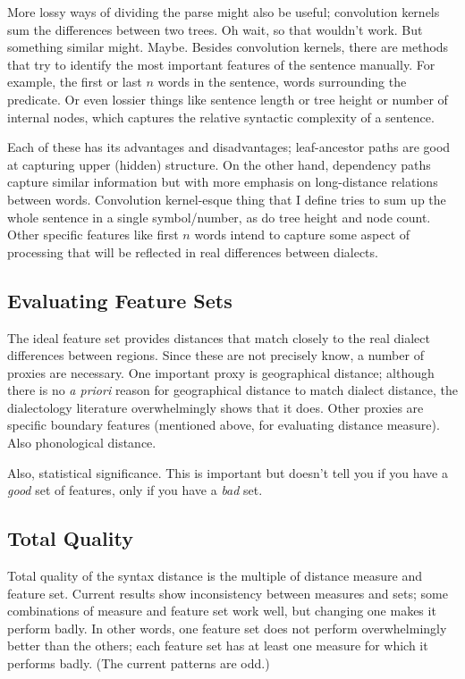 More lossy ways of dividing the parse might also be useful;
convolution kernels sum the differences between two trees. Oh wait, so
that wouldn't work. But something similar might. Maybe. Besides
convolution kernels, there are methods that try to identify the most
important features of the sentence manually. For example, the first or
last $n$ words in the sentence, words surrounding the predicate. Or
even lossier things like sentence length or tree height or number of
internal nodes, which captures the relative syntactic complexity of a
sentence.

Each of these has its advantages and disadvantages; leaf-ancestor
paths are good at capturing upper (hidden) structure. On the other
hand, dependency paths capture similar information but with more
emphasis on long-distance relations between words. Convolution
kernel-esque thing that I define tries to sum up the whole sentence in
a single symbol/number, as do tree height and node count. Other
specific features like first $n$ words intend to capture some aspect
of processing that will be reflected in real differences between
dialects.

\subsection{Evaluating Feature Sets}

The ideal feature set provides distances that match closely to the
real dialect differences between regions. Since these are not
precisely know, a number of proxies are necessary. One important proxy
is geographical distance; although there is no {\it a priori} reason
for geographical distance to match dialect distance, the dialectology
literature overwhelmingly shows that it does. Other proxies are
specific boundary features (mentioned above, for evaluating distance
measure). Also phonological distance.

Also, statistical significance. This is important but doesn't tell you
if you have a {\it good} set of features, only if you have a {\it bad}
set.

\subsection{Total Quality}

Total quality of the syntax distance is the multiple of distance measure
and feature set. Current results show inconsistency between measures
and sets; some combinations of measure and feature set work well, but
changing one makes it perform badly. In other words, one feature set
does not perform overwhelmingly better than the others; each feature
set has at least one measure for which it performs badly. (The
current patterns are odd.)


